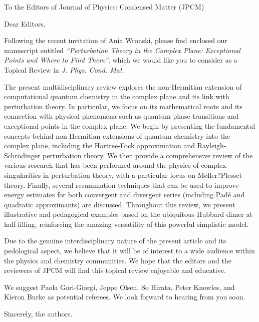 \documentclass[10pt]{letter}
\begin{document}
\begin{letter}%
{To the Editors of Journal of Physics: Condensed Matter (JPCM)}

\opening{Dear Editors,}

\justifying
Following the recent invitation of Ania Wronski, please find enclosed our manuscript entitled \textit{``Perturbation Theory in the Complex Plane: Exceptional Points and Where to Find Them''}, which we would like you to consider as a Topical Review in \textit{J. Phys. Cond. Mat.}

The present multidisciplinary review explores the non-Hermitian extension of computational quantum chemistry in the complex plane and its link with perturbation theory.
In particular, we focus on its mathematical roots and its connection with physical phenomena such as quantum phase transitions and exceptional points in the complex plane.
We begin by presenting the fundamental concepts behind non-Hermitian extensions of quantum chemistry into the complex plane, including the Hartree-Fock approximation and
Rayleigh-Schr\"odinger perturbation theory. 
We then provide a comprehensive review of the various research that has been performed around the physics of complex singularities in perturbation theory, with a particular focus on M{\o}ller?Plesset theory.
Finally, several resummation techniques that can be used to improve energy estimates for both convergent and divergent series (including Pad\'e and quadratic approximants) are discussed. 
Throughout this review, we present illustrative and pedagogical examples based on the ubiquitous Hubbard dimer at half-filling, reinforcing the amazing versatility of this powerful simplistic model.

Due to the genuine interdisciplinary nature of the present article and its pedological aspect, we believe that it will be of interest to a wide audience within the physics and chemistry communities.
We hope that the editors and the reviewers of JPCM will find this topical review enjoyable and educative.

We suggest Paola Gori-Giorgi, Jeppe Olsen, So Hirata, Peter Knowles, and Kieron Burke as potential referees.
We look forward to hearing from you soon.

\closing{Sincerely, the authors.}


\end{letter}
\end{document}
